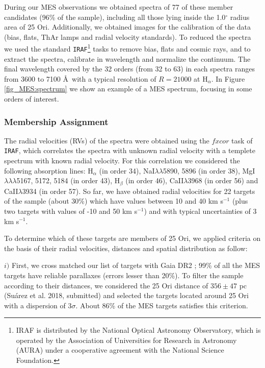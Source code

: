\documentclass[12pt]{article}
\newcounter{subsubsubsection}[subsubsection]
\begin{document}
\label{sec_echelle:reduction}
During our MES observations we obtained spectra of 77 of these member candidates (96\% of the sample), including all those lying inside the 1.0$^\circ$ radius area of 25 Ori. Additionally, we obtained images for the calibration of the data (bias, flats, ThAr lamps and radial velocity standards). To reduced the spectra we used the standard \texttt{IRAF}\footnote{IRAF is distributed by the National Optical Astronomy Observatory, which is operated by the Association of Universities for Research in Astronomy (AURA) under a cooperative agreement with the National Science Foundation.} tasks to remove bias, flats and cosmic rays, and to extract the spectra, calibrate in wavelength and normalize the continuum. The final wavelength covered by the 32 orders (from 32 to 63) in each spectra ranges from 3600 to 7100 \AA\ with a typical resolution of $R=21000$ at H$_\alpha$. In Figure \ref{fig_MES:spectrum} we show an example of a MES spectrum, focusing in some orders of interest.

\subsubsection{Membership Assignment}
\label{sec_MES:membership}
The radial velocities (RVs) of the spectra were obtained using the $fxcor$ task of \texttt{IRAF}, which correlates the spectra with unknown radial velocity with a templete spectrum with known radial velocity. For this correlation we considered the following absorption lines: H$_\alpha$ (in order 34), NaI$\lambda\lambda$5890, 5896 (in order 38), MgI$\lambda\lambda\lambda$5167, 5172, 5184 (in order 43), H$_\beta$ (in order 46), CaII$\lambda$3968 (in order 56) and CaII$\lambda$3934 (in order 57). So far, we have obtained radial velocities for 22 targets of the sample (about 30\%) which have values between 10 and 40 km s$^{-1}$ (plus two targets with values of -10 and 50 km s$^{-1}$) and with typical uncertainties of 3 km s$^{-1}$. 

To determine which of these targets are members of 25 Ori, we applied criteria on the basis of their radial velocities, distances and spatial distribution as follow:

$i)$ First, we cross matched our list of targets with Gaia DR2 \citep{GaiaCollaboration2018}; 99\% of all the MES targets have reliable parallaxes (errors lesser than 20\%). To filter the sample according to their distances, we considered the 25 Ori distance of $356\pm47$ pc (Su\'arez et al. 2018, submitted) and selected the targets located around 25 Ori with a dispersion of $3\sigma$. About 86\% of the MES targets satisfies this criterion. 
\end{document}
